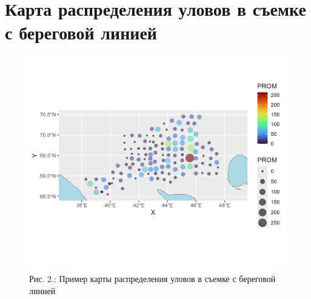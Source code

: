 \documentclass[
  letterpaper,
  DIV=11,
  numbers=noendperiod]{scrreprt}
\begin{document}
\section{Карта распределения уловов в съемке с береговой
линией}\label{ux43aux430ux440ux442ux430-ux440ux430ux441ux43fux440ux435ux434ux435ux43bux435ux43dux438ux44f-ux443ux43bux43eux432ux43eux432-ux432-ux441ux44aux435ux43cux43aux435-ux441-ux431ux435ux440ux435ux433ux43eux432ux43eux439-ux43bux438ux43dux438ux435ux439}

\begin{figure}[H]

{\centering \includegraphics[width=0.7\linewidth,height=\textheight,keepaspectratio]{images/KARTOGRAPH2.jpg}

}

\caption{Рис. 2.: Пример карты распределения уловов в съемке с береговой
линией}

\end{figure}%
\end{document}
